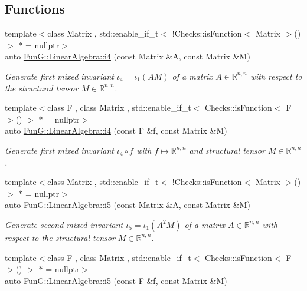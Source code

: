 \subsection*{Functions}
\begin{DoxyCompactItemize}
\item 
{\footnotesize template$<$class Matrix , std\+::enable\+\_\+if\+\_\+t$<$ !\+Checks\+::is\+Function$<$ Matrix $>$() $>$ $\ast$  = nullptr$>$ }\\auto \hyperlink{group__InvariantGroup_ga1898785172ecce11af0c27e54d555009}{Fun\+G\+::\+Linear\+Algebra\+::i4} (const Matrix \&A, const Matrix \&M)
\begin{DoxyCompactList}\small\item\em Generate first mixed invariant $ \iota_4=\iota_1(AM) $ of a matrix $A\in\mathbb{R}^{n,n}$ with respect to the structural tensor $M\in\mathbb{R}^{n,n}$. \end{DoxyCompactList}\item 
{\footnotesize template$<$class F , class Matrix , std\+::enable\+\_\+if\+\_\+t$<$ Checks\+::is\+Function$<$ F $>$() $>$ $\ast$  = nullptr$>$ }\\auto \hyperlink{group__InvariantGroup_ga0df96cdb1e4b8b5a040f2adc97c51100}{Fun\+G\+::\+Linear\+Algebra\+::i4} (const F \&f, const Matrix \&M)
\begin{DoxyCompactList}\small\item\em Generate first mixed invariant $ \iota_4\circ f $ with $f\mapsto\mathbb{R}^{n,n}$ and structural tensor $M\in\mathbb{R}^{n,n}$. \end{DoxyCompactList}\item 
{\footnotesize template$<$class Matrix , std\+::enable\+\_\+if\+\_\+t$<$ !\+Checks\+::is\+Function$<$ Matrix $>$() $>$ $\ast$  = nullptr$>$ }\\auto \hyperlink{group__InvariantGroup_gabedc42182203d883278e29fd16b355a0}{Fun\+G\+::\+Linear\+Algebra\+::i5} (const Matrix \&A, const Matrix \&M)
\begin{DoxyCompactList}\small\item\em Generate second mixed invariant $ \iota_5=\iota_1(A^2M) $ of a matrix $A\in\mathbb{R}^{n,n}$ with respect to the structural tensor $M\in\mathbb{R}^{n,n}$. \end{DoxyCompactList}\item 
{\footnotesize template$<$class F , class Matrix , std\+::enable\+\_\+if\+\_\+t$<$ Checks\+::is\+Function$<$ F $>$() $>$ $\ast$  = nullptr$>$ }\\auto \hyperlink{group__InvariantGroup_gaed7e47c39d89f2b01e25c992da78b44d}{Fun\+G\+::\+Linear\+Algebra\+::i5} (const F \&f, const Matrix \&M)

\end{DoxyCompactItemize}
